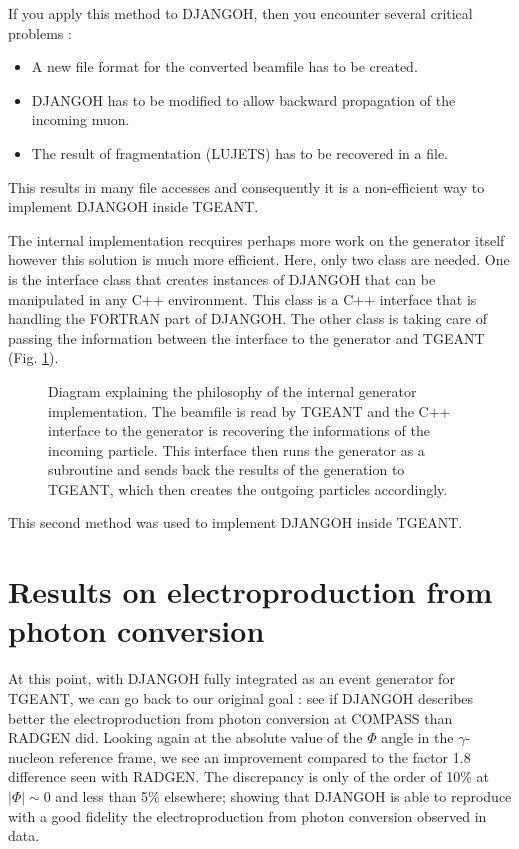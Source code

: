 If you apply this method to DJANGOH, then you encounter several critical problems :
\begin{itemize}
\item A new file format for the converted beamfile has to be created.
\item DJANGOH has to be modified to allow backward propagation of the incoming muon.
\item The result of fragmentation (LUJETS) has to be recovered in a file.
\end{itemize}
This results in many file accesses and consequently it is a non-efficient way to
implement DJANGOH inside TGEANT.

The internal implementation recquires perhaps more work on the generator itself however
this solution is much more efficient. Here, only two class are needed. One is the
interface class that creates instances of DJANGOH that can be manipulated in any C++
environment. This class is a C++ interface that is handling the FORTRAN part of DJANGOH.
The other class is taking care of passing the information between the interface to the
generator and TGEANT (Fig. \ref{fig:pythiaex}).

\begin{figure}[!htb]
\centerline{}
\caption{Diagram explaining the philosophy of the internal generator implementation.
The beamfile is read by TGEANT and the C++ interface to the generator is recovering the
informations of the incoming particle. This interface then runs the generator as a subroutine
and sends back the results of the generation to TGEANT, which then creates the outgoing particles
accordingly.}\label{fig:pythiaex}
\end{figure}

This second method was used to implement DJANGOH inside TGEANT.


\section{Results on electroproduction from photon conversion}

At this point, with DJANGOH fully integrated as an event generator for TGEANT, we can go back to our original goal : see if DJANGOH describes better the electroproduction from photon conversion at COMPASS than RADGEN did. Looking again at the absolute value of the $\Phi$ angle in the $\gamma$-nucleon reference frame, we see an improvement compared to the factor 1.8 difference seen with RADGEN. The discrepancy is only of the order of 10\% at $|\Phi| \sim 0$ and less than 5\% elsewhere; showing that DJANGOH is able to reproduce with a good fidelity the electroproduction from photon conversion observed in data.

